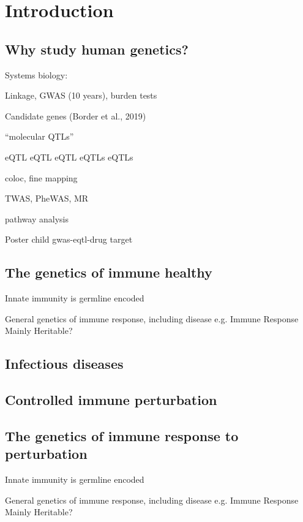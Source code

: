 %
%

\chapter{Introduction}

\section{Why study human genetics?}

Systems biology:

Linkage, GWAS (10 years), burden tests

Candidate genes (Border et al., 2019)

\enquote{molecular QTLs}

\gls{eQTL}
\gls{eQTL}
\gls{eQTL}
\glspl{eQTL}
\Glspl{eQTL}

coloc, fine mapping

TWAS, PheWAS\autocite{verma2017CurrentScopeChallenges}, MR

pathway analysis

Poster child gwas-eqtl-drug target

\section{The genetics of immune healthy}

Innate immunity is germline encoded

General genetics of immune response, including disease e.g. Immune Response Mainly Heritable? 

\section{Infectious diseases}

\section{Controlled immune perturbation}

\section{The genetics of immune response to perturbation}

Innate immunity is germline encoded

General genetics of immune response, including disease e.g. Immune Response Mainly Heritable? 

